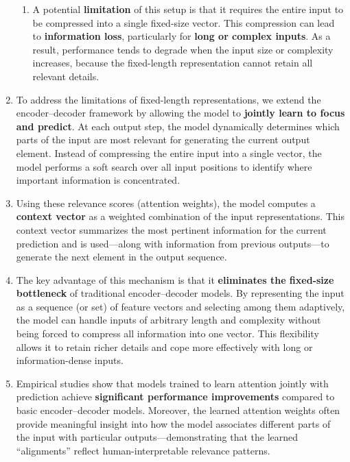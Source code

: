 \begin{enumerate}
\begin{enumerate}
        \item A potential \textbf{limitation} of this setup is that it requires the entire input to be compressed into a single fixed-size vector. 
        This compression can lead to \textbf{information loss}, particularly for \textbf{long or complex inputs}. 
        As a result, performance tends to degrade when the input size or complexity increases, because the fixed-length representation cannot retain all relevant details.
        \hfill \cite{arxiv/1409.0473/NMT-Jointly-Learning-Align-Translate, common/online/chatgpt}
    \end{enumerate}

    \item To address the limitations of fixed-length representations, we extend the encoder–decoder framework by allowing the model to \textbf{jointly learn to focus and predict}.
    At each output step, the model dynamically determines which parts of the input are most relevant for generating the current output element.
    Instead of compressing the entire input into a single vector, the model performs a soft search over all input positions to identify where important information is concentrated.
    \hfill \cite{arxiv/1409.0473/NMT-Jointly-Learning-Align-Translate, common/online/chatgpt}

    \item Using these relevance scores (attention weights), the model computes a \textbf{context vector} as a weighted combination of the input representations.
    This context vector summarizes the most pertinent information for the current prediction and is used—along with information from previous outputs—to generate the next element in the output sequence.
    \hfill \cite{arxiv/1409.0473/NMT-Jointly-Learning-Align-Translate, common/online/chatgpt}

    \item The key advantage of this mechanism is that it \textbf{eliminates the fixed-size bottleneck} of traditional encoder–decoder models.
    By representing the input as a sequence (or set) of feature vectors and selecting among them adaptively, the model can handle inputs of arbitrary length and complexity without being forced to compress all information into one vector.
    This flexibility allows it to retain richer details and cope more effectively with long or information-dense inputs.
    \hfill \cite{arxiv/1409.0473/NMT-Jointly-Learning-Align-Translate, common/online/chatgpt}

    \item Empirical studies show that models trained to learn attention jointly with prediction achieve \textbf{significant performance improvements} compared to basic encoder–decoder models.
    Moreover, the learned attention weights often provide meaningful insight into how the model associates different parts of the input with particular outputs—demonstrating that the learned “alignments” reflect human-interpretable relevance patterns.
    \hfill \cite{arxiv/1409.0473/NMT-Jointly-Learning-Align-Translate, common/online/chatgpt}
\end{enumerate}




